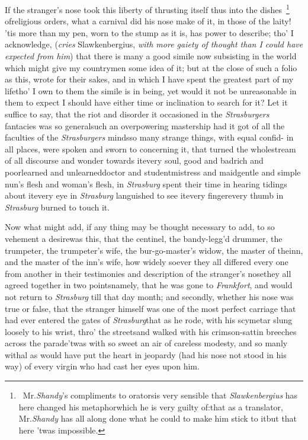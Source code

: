 \documentclass{article}
\begin{document}
If the stranger’s nose took this liberty of thrusting itself thus into
the dishes~\footnote{\ Mr.\@ \textit{Shandy}’s compliments
to orators\tsh is very sensible that \textit{Slawkenbergius}
has here changed his metaphor\tsk which he is very guilty
of:\tsk that as a translator, Mr.\@ \textit{Shandy} has all
along done what he could to make him stick to it\tsk but
that here ’twas impossible.}
of\pb religious orders, \etc what a carnival did his nose make of it, in those of the
laity!\break
\tsk ’tis more than my pen, worn to the stump as it is, has power to describe;
tho’ I acknowledge, (\textit{cries} Slawkenbergius,\break
\textit{with more gaiety of
thought than I could have expected from him}) that there is many a good simile now
subsisting in the world which might give my countrymen some idea of it; but at the
close of such a folio as this, wrote for their sakes, and in which I have spent the
greatest part of my life\tsh tho’ I own to them the simile is in being, yet would it
not be unreasonable in them to expect I should have either time or inclination to
search for it? Let it suffice to say, that the riot and disorder it occasioned in
the \textit{Strasburgers} fantacies was so general\tsk such an overpowering mastership
had it got of all the faculties of the \textit{Strasburgers}
minds\tsk so\pb
many strange
things, with equal confid-
in all places,
were spoken and sworn to concerning it, that turned the
whole\break stream of all
discourse and wonder towards it\tsk every soul, good and bad\tsk rich and poor\tsk learned
and unlearned\tsk doctor and student\tsk mistress and maid\tsk gentle and simple\tsk
nun’s flesh and wo\-man’s flesh, in \textit{Strasburg} spent their time in hearing
tidings about it\tsk every eye in \textit{Strasburg}
languished to see it\tsk every
finger\tsk every thumb in \textit{Strasburg} burned to touch it.


Now what might add, if any thing may be thought necessary to
add, to so vehement a desire\tsk was this, that the centinel, the
bandy-legg’d drummer, the trumpeter, the trumpeter’s
wife, the bur-go-master’s widow, the master of the\pb inn, and the
master of the inn’s wife, how widely soever they all
differed every one from another in their testimonies and
description of the stranger’s nose\tsk they all agreed
together in two points\tsk namely, that he was gone to
\textit{Frankfort}, and would not return to
\textit{Strasburg} till that day month; and secondly,
whether his nose was true or false, that the stran\-ger
himself was one of the most perfect 
\break
{}\break
{}
carriage that had ever entered the gates of
\textit{Strasburg}\tsk that as he rode, with his scymetar slung
loosely to his wrist, thro’ the streets\tsk and walked with
his crimson-sattin breeches across the parade\tsk ’twas with
so sweet an air of careless modesty, and so manly withal\tsk
as would have put the heart in jeopardy (had his nose not\pb
stood in his way) of every virgin who had cast her eyes upon
him.
\end{document}
